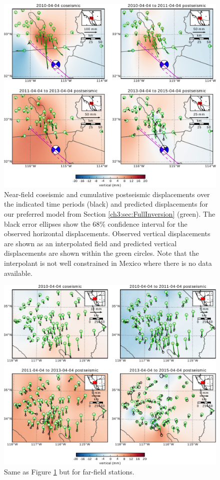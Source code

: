 \begin{figure}
\includegraphics[scale=1.0]{ch3/figures/2016jb013114-p04}
\centering 
\caption{Near-field coseismic and cumulative postseismic displacements over the indicated time periods (black) and predicted displacements for our preferred model from Section \ref{ch3:sec:FullInversion} (green).  The black error ellipses show the 68\% confidence interval for the observed horizontal displacements.  Observed vertical displacements are shown as an interpolated field and predicted vertical displacements are shown within the green circles.  Note that the interpolant is not well constrained in Mexico where there is no data available.}
\label{ch3:fig:NearField}
\end{figure}

\begin{figure}
\includegraphics[scale=1.0]{ch3/figures/2016jb013114-p05}
\centering 
\caption{Same as Figure \ref{ch3:fig:NearField} but for far-field stations.}
\label{ch3:fig:FarField}
\end{figure}

